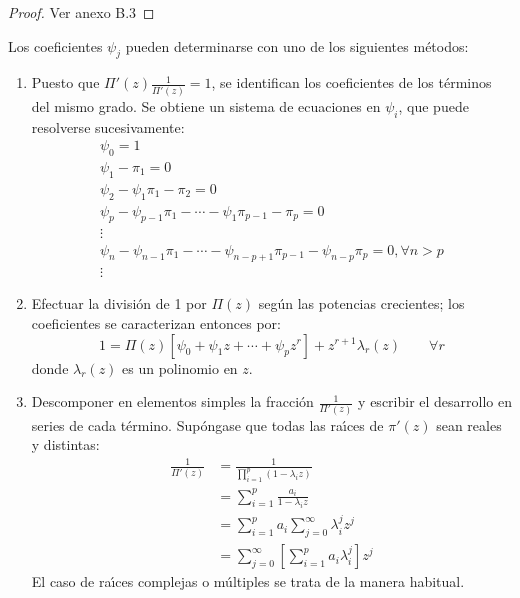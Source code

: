 \begin{proof}
 Ver anexo B.3
\end{proof}

\begin{observacion}
Los coeficientes $\psi_{j} $ pueden determinarse con uno de los siguientes m\'{e}todos: 

\begin{enumerate}
\item Puesto que $\Pi'(z)\frac 1{\Pi'(z)}=1$, se identifican los coeficientes de los t\'{e}rminos del mismo grado. Se obtiene un sistema de ecuaciones en $\psi_{i} $, que puede resolverse sucesivamente:
\begin{gather*}
 \psi_{0} =1 \\ 
 \psi_{1} -\pi_{1} =0 \\ 
 \psi_{2} -\psi_{1} \pi_{1} -\pi_{2} =0 \\ 
 \psi_{p} -\psi_{p-1} \pi_{1} -\cdots-\psi_{1} \pi_{p-1} -\pi_{p} =0 \\ 
 \vdots \\ 
 \psi_{n} -\psi_{n-1} \pi_{1}-\cdots-\psi_{n-p+1} \pi_{p-1} -\psi_{n-p} \pi_{p} =0, \forall n>p \\ 
 \vdots 
\end{gather*}

\item Efectuar la divisi\'{o}n de 1 por $\Pi(z)$ seg\'{u}n las potencias crecientes; los coeficientes se caracterizan entonces por:
\[
 1=\Pi(z)[\psi_0+\psi_1z+\cdots+ \psi_pz^r]+z^{r+1}\lambda_r(z)\qquad \forall r
\]
donde $\lambda_{r}( z )$ es un polinomio en $z$. 

\item Descomponer en elementos simples la fracci\'{o}n $\frac{1}{\Pi'( z )}$ y escribir el desarrollo en series de cada t\'{e}rmino. Sup\'{o}ngase que todas las ra\'{\i}ces de $\pi'( z )$ sean reales y distintas:
\begin{align*}
\frac{1}{\Pi'\left( z \right)}
	&=\frac{1}{\prod_{i=1}^{p} ( {1-\lambda_{i} z} )}\\
	&=\sum_{i=1}^p {\frac{a_{i}}{1-\lambda_{i} z}}\\
	&=\sum_{i=1}^p {a_{i} } \sum_{j=0}^\infty {\lambda_{i}^{j} } z^{j}\\
	&=\sum_{j=0}^\infty {\left[ {\sum_{i=1}^p {a_{i} \lambda _{i}^{j} } } \right]} z^{j}
\end{align*}
El caso de ra\'{\i}ces complejas o m\'{u}ltiples se trata de la manera 
habitual.
\end{enumerate}
\end{observacion}


